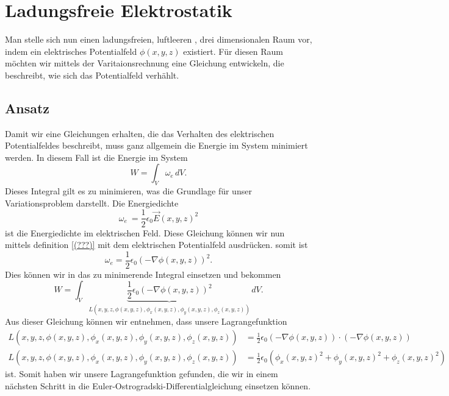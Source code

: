 \section{Ladungsfreie Elektrostatik
\label{maxwell:section:equation1_ohne_quelle}}
Man stelle sich nun einen ladungsfreien, luftleeren , drei dimensionalen Raum vor, indem ein elektrisches Potentialfeld $\phi(x,y,z)$ existiert.
Für diesen Raum möchten wir mittels der Varitaionsrechnung eine Gleichung entwickeln, die beschreibt, wie sich das Potentialfeld verhählt. 

\subsection{Ansatz}
Damit wir eine Gleichungen erhalten, die das Verhalten des elektrischen Potentialfeldes beschreibt, muss ganz allgemein die Energie im System minimiert werden. 
In diesem Fall ist die Energie im System
\[
W
=
\int_V \omega_e\, dV.
\]
Dieses Integral gilt es zu minimieren, was die Grundlage für unser Variationsproblem darstellt.
Die Energiedichte
\[
\omega_e\
=
\frac{1}{2}\epsilon_0\vec{E}(x,y,z)^2
\]
ist die Energiedichte im elektrischen Feld.
Diese Gleichung können wir nun mittels definition \ref{(???)} mit dem elektrischen Potentialfeld ausdrücken.
somit ist
\[
\omega_e
=
\frac{1}{2}\epsilon_0\left(-\nabla\phi(x,y,z)\right)^2.
\]
Dies können wir in das zu minimerende Integral einsetzen und bekommen
\begin{equation}
W
=
\int_V \underbrace{
\frac{1}{2}\epsilon_0\left(-\nabla\phi(x,y,z)\right)^2}_{L(x,y,z,\phi(x,y,z),\phi_x(x,y,z),\phi_y(x,y,z),\phi_z(x,y,z))}\, dV.
\label{maxwell:section:energieintegral_quellenfrei}
\end{equation}
Aus dieser Gleichung können wir entnehmen, dass unsere Lagrangefunktion
\begin{align}
L(x,y,z,\phi(x,y,z),\phi_x(x,y,z),\phi_y(x,y,z),\phi_z(x,y,z))
&=
\frac{1}{2}\epsilon_0\left(-\nabla\phi(x,y,z)\right)\cdot\left(-\nabla\phi(x,y,z)\right)
\\
L(x,y,z,\phi(x,y,z),\phi_x(x,y,z),\phi_y(x,y,z),\phi_z(x,y,z))
&=
\frac{1}{2}\epsilon_0\left(\phi_x(x,y,z)^2 + \phi_y(x,y,z)^2 + \phi_z(x,y,z)^2\right)
\label{maxwell:section:lagrangefunktion_quellenfrei}
\end{align}
ist.
Somit haben wir unsere Lagrangefunktion gefunden, die wir in einem nächsten Schritt in die Euler-Ostrogradski-Differentialgleichung einsetzen können.

